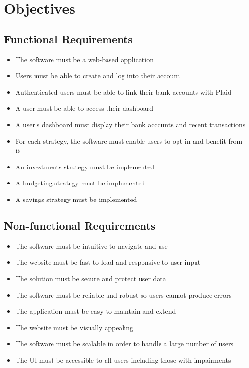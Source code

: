 \section{Objectives}

\subsection{Functional Requirements}
\begin{itemize}
	\item The software must be a web-based application
	\item Users must be able to create and log into their account
	\item Authenticated users must be able to link their bank accounts with Plaid
	\item A user must be able to access their dashboard
	\item A user's dashboard must display their bank accounts and recent transactions
	\item For each strategy, the software must enable users to opt-in and benefit from it 
	\item An investments strategy must be implemented
	\item A budgeting strategy must be implemented
	\item A savings strategy must be implemented
\end{itemize}

\subsection{Non-functional Requirements}
\begin{itemize}
	\item The software must be intuitive to navigate and use
	\item The website must be fast to load and responsive to user input
	\item The solution must be secure and protect user data
	\item The software must be reliable and robust so users cannot produce errors
	\item The application must be easy to maintain and extend
	\item The website must be visually appealing
	\item The software must be scalable in order to handle a large number of users
	\item The UI must be accessible to all users including those with impairments
\end{itemize}

